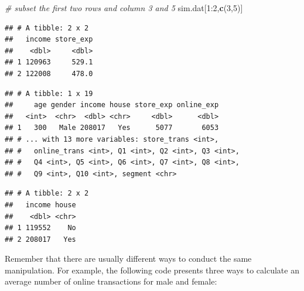 \documentclass[12pt,]{krantz}
\newenvironment{Shaded}{\begin{snugshade}}{\end{snugshade}}
\newcommand{\KeywordTok}[1]{\textcolor[rgb]{0.13,0.29,0.53}{\textbf{{#1}}}}
\newcommand{\DecValTok}[1]{\textcolor[rgb]{0.00,0.00,0.81}{{#1}}}
\newcommand{\StringTok}[1]{\textcolor[rgb]{0.31,0.60,0.02}{{#1}}}
\newcommand{\CommentTok}[1]{\textcolor[rgb]{0.56,0.35,0.01}{\textit{{#1}}}}
\newcommand{\NormalTok}[1]{{#1}}
\theoremstyle{definition}
\theoremstyle{definition}
\theoremstyle{remark}
\begin{document}
\begin{Shaded}
\begin{Highlighting}[]
\CommentTok{# subset the first two rows and column 3 and 5}
\NormalTok{sim.dat[}\DecValTok{1}\NormalTok{:}\DecValTok{2}\NormalTok{,}\KeywordTok{c}\NormalTok{(}\DecValTok{3}\NormalTok{,}\DecValTok{5}\NormalTok{)]}
\end{Highlighting}
\end{Shaded}

\begin{verbatim}
## # A tibble: 2 x 2
##   income store_exp
##    <dbl>     <dbl>
## 1 120963     529.1
## 2 122008     478.0
\end{verbatim}

\begin{Shaded}
\end{Shaded}

\begin{verbatim}
## # A tibble: 1 x 19
##     age gender income house store_exp online_exp
##   <int>  <chr>  <dbl> <chr>     <dbl>      <dbl>
## 1   300   Male 208017   Yes      5077       6053
## # ... with 13 more variables: store_trans <int>,
## #   online_trans <int>, Q1 <int>, Q2 <int>, Q3 <int>,
## #   Q4 <int>, Q5 <int>, Q6 <int>, Q7 <int>, Q8 <int>,
## #   Q9 <int>, Q10 <int>, segment <chr>
\end{verbatim}

\begin{Shaded}
\end{Shaded}

\begin{verbatim}
## # A tibble: 2 x 2
##   income house
##    <dbl> <chr>
## 1 119552    No
## 2 208017   Yes
\end{verbatim}

Remember that there are usually different ways to conduct the same
manipulation. For example, the following code presents three ways to
calculate an average number of online transactions for male and female:
\end{document}
